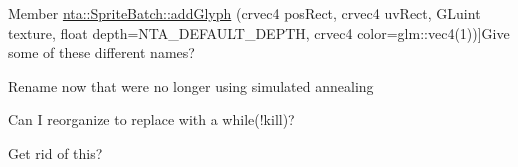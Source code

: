 \begin{DoxyRefList}
%
Member \hyperlink{classnta_1_1SpriteBatch_aa703fb92d0bd42865c21fdfb2625660d}{nta\+:\+:Sprite\+Batch\+:\+:add\+Glyph} (crvec4 pos\+Rect, crvec4 uv\+Rect, G\+Luint texture, float depth=N\+T\+A\+\_\+\+D\+E\+F\+A\+U\+L\+T\+\_\+\+D\+E\+P\+TH, crvec4 color=glm\+::vec4(1))]Give some of these different names?  
\item[\label{todo__todo000011}%
\Hypertarget{todo__todo000011}%
Member \hyperlink{classnta_1_1SpriteFont_a9dc96f31efd0830dcb476ea87534e358}{nta\+:\+:Sprite\+Font\+:\+:Sprite\+Font} (crstring font\+Path, unsigned int size)]Rename now that we\textquotesingle{}re no longer using simulated annealing  
\item[\label{todo__todo000012}%
\Hypertarget{todo__todo000012}%
Member \hyperlink{classnta_1_1utils_1_1ThreadPool_a2ca98ba5ed4510e5aac90c0507859b8d}{nta\+:\+:utils\+:\+:Thread\+Pool\+:\+:dispatcher} ()]Can I reorganize to replace with a while(!kill)?  
\item[\label{todo__todo000014}%
\Hypertarget{todo__todo000014}%
Member \hyperlink{classnta_1_1Window_aa144f6bb014aaad3c91c3f3e6ad56f9c}{nta\+:\+:Window\+:\+:screenshot} () const]Get rid of this? 
\end{DoxyRefList}